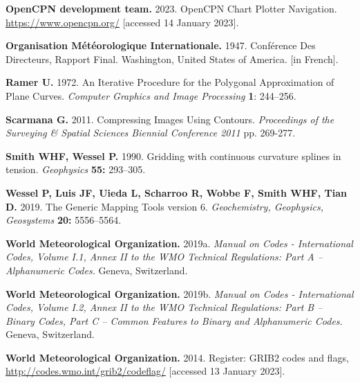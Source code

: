 \documentclass[12pt,a4paper]{article}
\begin{document}
\begin{thebibliography}{00}
\textbf{OpenCPN development team.}
2023.
OpenCPN Chart Plotter Navigation.
\url{https://www.opencpn.org/}
[accessed 14 January 2023].

\textbf{Organisation Météorologique Internationale.}
1947.
Conférence Des Directeurs, Rapport Final.
Washington, United States of America. [in French].

\textbf{Ramer U.}
1972.
An Iterative Procedure for the Polygonal Approximation of Plane Curves.
\textsl{Computer Graphics and Image Processing} \textbf{1}: 244--256.

\textbf{Scarmana G.}
2011.
Compressing Images Using Contours.
\textsl{Proceedings of the Surveying \& Spatial Sciences Biennial Conference 2011}
pp. 269-277.

\textbf{Smith WHF, Wessel P.}
1990.
Gridding with continuous curvature splines in tension.
\textsl{Geophysics} \textbf{55:} 293--305.

\textbf{Wessel P, Luis JF, Uieda L, Scharroo R, Wobbe F, Smith WHF, Tian D.}
2019.
The Generic Mapping Tools version 6.
\textsl{Geochemistry, Geophysics, Geosystems} \textbf{20:} 5556--5564.

\textbf{World Meteorological Organization.}
2019a.
\textsl{Manual on Codes - International Codes, Volume I.1, Annex II to the WMO
Technical Regulations: Part A -- Alphanumeric Codes.}
Geneva, Switzerland.

\textbf{World Meteorological Organization.}
2019b.
\textsl{Manual on Codes - International Codes, Volume I.2, Annex II
to the WMO Technical Regulations: Part B -- Binary Codes, Part C -- Common
Features to Binary and Alphanumeric Codes.}
Geneva, Switzerland.

\textbf{World Meteorological Organization.}
2014.
Register: GRIB2 codes and flags,
\url{http://codes.wmo.int/grib2/codeflag/}
[accessed 13 January 2023].

\end{thebibliography}	
	
\end{document}
